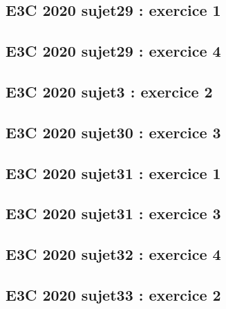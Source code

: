 \documentclass[lang=fr,edition=teacher,layout=sheet]{mxbook}
\begin{document}
\subsection*{E3C 2020 sujet29 : exercice 1}
\begingroup\endgroup
\par\bigskip
{}\subsection*{E3C 2020 sujet29 : exercice 4}
\begingroup\endgroup
\par\bigskip
{}\subsection*{E3C 2020 sujet3 : exercice 2}
\begingroup\endgroup
\par\bigskip
{}\subsection*{E3C 2020 sujet30 : exercice 3}
\begingroup\endgroup
\par\bigskip
{}\subsection*{E3C 2020 sujet31 : exercice 1}
\begingroup\endgroup
\par\bigskip
{}\subsection*{E3C 2020 sujet31 : exercice 3}
\begingroup\endgroup
\par\bigskip
{}\subsection*{E3C 2020 sujet32 : exercice 4}
\begingroup\endgroup
\par\bigskip
{}\subsection*{E3C 2020 sujet33 : exercice 2}
\end{document}
